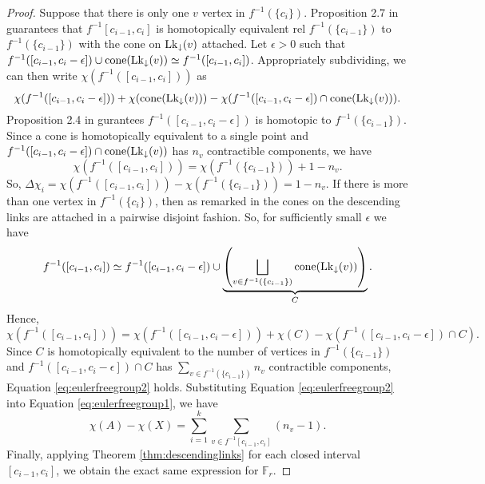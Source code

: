 \begin{proof}
    Suppose that there is only one \(v\) vertex in \(f^{-1}(\{c_i\})\). 
    Proposition 2.7 in \cite{Bestvina2008PL} guarantees that 
    \(f^{-1}[c_{i-1}, c_i]\) is homotopically equivalent rel \(f^{-1}(\{c_{i-1}\})\) to \(f^{-1}(\{c_{i-1}\})\)
    with the cone on \(\mathrm{Lk}_{\downarrow}(v)\) attached. 
    Let \(\epsilon > 0\) such that \(f^{-1}([c_{i-1}, c_i - \epsilon])\cup \mathrm{cone}(\mathrm{Lk}_{\downarrow}(v)) \simeq f^{-1}([c_{i-1}, c_i])\).
    Appropriately subdividing, we can then write \(\chi(f^{-1}([c_{i-1}, c_i]))\) as
    \[
        \chi(f^{-1}([c_{i-1}, c_i - \epsilon])) + \chi(\mathrm{cone}(\mathrm{Lk}_{\downarrow}(v))) - \chi(f^{-1}([c_{i-1}, c_i - \epsilon]) \cap \mathrm{cone}(\mathrm{Lk}_{\downarrow}(v))).
    \]
    Proposition 2.4 in \cite{Bestvina2008PL} gurantees \(f^{-1}([c_{i-1}, c_i - \epsilon])\) is homotopic to \(f^{-1}(\{c_{i-1}\})\).
    Since a cone is homotopically equivalent to a single point and \(f^{-1}([c_{i-1}, c_i - \epsilon]) \cap \mathrm{cone}(\mathrm{Lk}_{\downarrow}(v))\) has \(n_v\) contractible components,
    we have
    \[
    \chi(f^{-1}([c_{i-1}, c_i])) = \chi(f^{-1}(\{c_{i-1}\})) + 1 - n_v.
    \]
    So, \(\Delta\chi_i = \chi(f^{-1}([c_{i-1}, c_i])) - \chi(f^{-1}(\{c_{i-1}\})) = 1 - n_v\).
    If there is more than one vertex in \(f^{-1}(\{c_i\})\), then as remarked in \cite{Bestvina2008PL}
    the cones on the descending links are attached in a pairwise disjoint fashion.
    So, for sufficiently small \(\epsilon\) we have 
    \[
        f^{-1}([c_{i-1}, c_i]) \simeq f^{-1}([c_{i-1}, c_i - \epsilon]) \cup \underbrace{\left(\bigsqcup_{v \in f^{-1}(\{c_{i-1}\})}\mathrm{cone}(\mathrm{Lk}_{\downarrow}(v))\right)}_{C}.
    \]
    Hence,
    \(\chi(f^{-1}([c_{i-1}, c_i])) = \chi(f^{-1}([c_{i-1}, c_i - \epsilon])) + \chi(C) - \chi(f^{-1}([c_{i-1}, c_i - \epsilon]) \cap C).\)
    Since \(C\) is homotopically equivalent to the number of vertices in \(f^{-1}(\{c_{i-1}\})\)
    and \(f^{-1}([c_{i-1}, c_i - \epsilon]) \cap C\) has \(\sum_{v \in f^{-1}(\{c_{i-1}\})} n_v\) contractible components,
    Equation \ref{eq:eulerfreegroup2} holds.
    Substituting Equation \ref{eq:eulerfreegroup2} into Equation \ref{eq:eulerfreegroup1}, we have
    \[
        \chi(A) - \chi(X) = \sum_{i=1}^k \sum_{v \in f^{-1}[c_{i-1}, c_i]} (n_v - 1).
    \]
    Finally, applying Theorem \ref{thm:descendinglinks} for each closed interval \([c_{i-1}, c_i]\), 
    we obtain the exact same expression for \(\mathbb{F}_r\).
\end{proof}